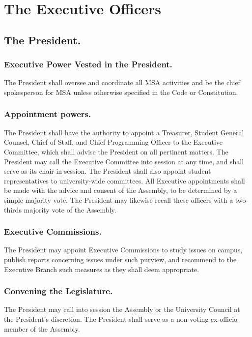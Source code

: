 
\section{The Executive Officers}

\subsection{The President.}
\subsubsection{Executive Power Vested in the President.}
The President shall oversee and coordinate all MSA activities and be the chief spokesperson for MSA unless otherwise specified in the Code or Constitution.
\subsubsection{Appointment powers.}
The President shall have the authority to appoint a Treasurer, Student General Counsel, Chief of Staff, and Chief Programming Officer to the Executive Committee, which shall advise the President on all pertinent matters. The President may call the Executive Committee into session at any time, and shall serve as its chair in session.
The President shall also appoint student representatives to university-wide committees.
All Executive appointments shall be made with the advice and consent of the Assembly, to be determined by a simple majority vote.
The President may likewise recall these officers with a two-thirds majority vote of the Assembly. 
	
\subsubsection{Executive Commissions.}
The President may appoint Executive Commissions to study issues on campus, publish reports concerning issues under such purview, and recommend to the Executive Branch such measures as they shall deem appropriate.

\subsubsection{Convening the Legislature.}
The President may call into session the Assembly or the University Council at the President's discretion. The President shall serve as a non-voting ex-officio member of the Assembly.

